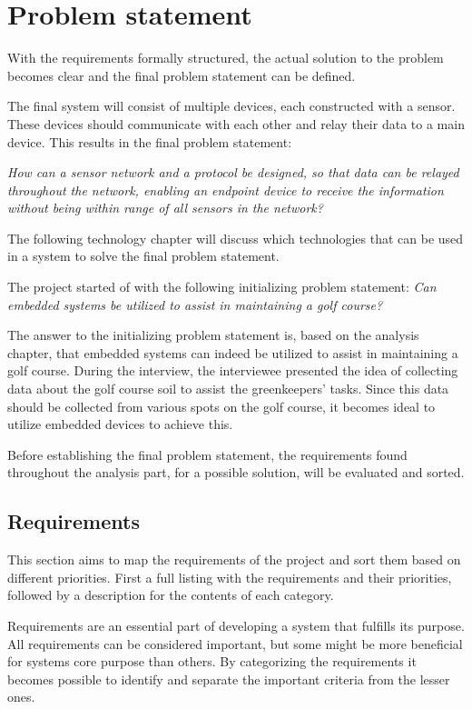 \chapter{Problem statement}
With the requirements formally structured, the actual solution to the problem becomes clear and the final problem statement can be defined.

The final system will consist of multiple devices, each constructed with a sensor. These devices should communicate with each other and relay their data to a main device. This results in the final problem statement:

\textit{How can a sensor network and a protocol be designed, so that data can be relayed throughout the network, enabling an endpoint device to receive the information without being within range of all sensors in the network?}

The following technology chapter will discuss which technologies that can be used in a system to solve the final problem statement.

The project started of with the following initializing problem statement:
\textit{Can embedded systems be utilized to assist in maintaining a golf course?}

The answer to the initializing problem statement is, based on the analysis chapter, that embedded systems can indeed be utilized to assist in maintaining a golf course. During the interview, the interviewee presented the idea of collecting data about the golf course soil to assist the greenkeepers' tasks. Since this data should be collected from various spots on the golf course, it becomes ideal to utilize embedded devices to achieve this.

Before establishing the final problem statement, the requirements found throughout the analysis part, for a possible solution, will be evaluated and sorted.

\section{Requirements}
This section aims to map the requirements of the project and sort them based on different priorities. First a full listing with the requirements and their priorities, followed by a description for the contents of each category.

Requirements are an essential part of developing a system that fulfills its purpose. All requirements can be considered important, but some might be more beneficial for systems core purpose than others. By categorizing the requirements it becomes possible to identify and separate the important criteria from the lesser ones. 

